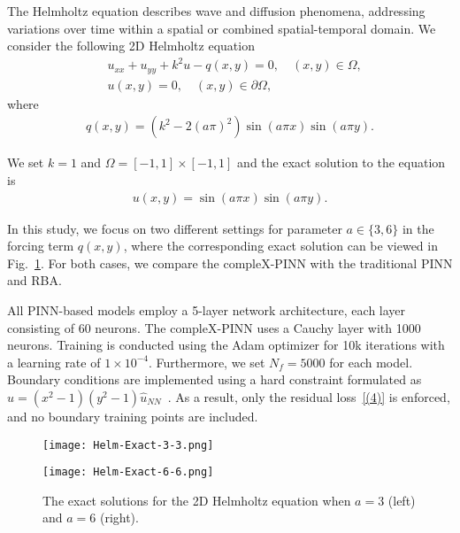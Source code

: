 The Helmholtz equation describes wave and diffusion phenomena, addressing variations over time within a spatial or combined spatial-temporal domain. We consider the following 2D Helmholtz equation
\begin{align}
    &u_{xx}+u_{yy} + k^2u - q(x,y) = 0, \quad (x,y) \in \Omega, \\
    &u(x,y) = 0, \quad (x,y)\in\partial\Omega, 
\end{align}
where
\begin{align}
    q(x,y) = (k^2-2(a\pi)^2)\sin(a\pi x)\sin(a\pi y).
\end{align}

We set $k = 1$ and $\Omega = [-1, 1]\times [-1,1]$ and the exact solution to the equation is
\begin{align}
    u(x,y) = \sin(a\pi x)\sin(a\pi y).
\end{align}

In this study, we focus on two different settings for parameter $a \in \{3,6\}$ in the forcing term $q(x,y)$, where the corresponding exact solution can be viewed in Fig.~\ref{Helm exact}. For both cases, we compare the compleX-PINN with the traditional PINN and RBA. 

All PINN-based models employ a 5-layer network architecture, each layer consisting of 60 neurons. The compleX-PINN uses a Cauchy layer with 1000 neurons. Training is conducted using the Adam optimizer for 10k iterations with a learning rate of $1 \times 10^{-4}$. Furthermore, we set $N_f = 5000$ for each model. Boundary conditions are implemented using a hard constraint formulated as $\hat{u} = (x^2-1)(y^2-1)\hat{u}_{NN}$~\cite{lu2021physics, sukumar2022exact,RRef4}. As a result, only the residual loss~\eqref{(4)} is enforced, and no boundary training points are included.

\begin{figure}[!htb]
    \centering
    \begin{minipage}{0.45\textwidth}
    \centering
    \texttt{[image: Helm-Exact-3-3.png]}    
    \end{minipage}
    \begin{minipage}{0.45\textwidth}
   \centering
    \texttt{[image: Helm-Exact-6-6.png]}
    \end{minipage}
    \vspace{1em} %
   \caption{The exact solutions for the 2D Helmholtz equation when $a = 3$ (left) and $a = 6$ (right).}\label{Helm exact}
\end{figure}

